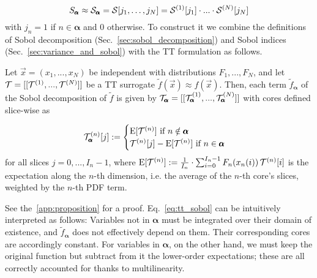 \documentclass[review, twocolumn]{svjour3}          %
\begin{document}
\begin{equation}
S_{\pmb{\alpha}} \approx \mathcal{S}_{\pmb{\alpha}} = \mathcal{S}[j_1, \dots, j_N] = \mathcal{S}^{(1)}[j_1] \cdot ... \cdot \mathcal{S}^{(N)}[j_N]
\end{equation}
%
with $j_n = 1$ if $n \in \pmb{\alpha}$ and $0$ otherwise. 
To construct it we combine the definitions of Sobol decomposition (Sec.~\ref{sec:sobol_decomposition}) and Sobol indices (Sec.~\ref{sec:variance_and_sobol}) with the TT formulation as follows.

\begin{proposition} \label{prop:tt_sobol}
Let $\vec{x} = (x_1, ..., x_N)$ be independent with distributions $F_1, ..., F_N$, and let $\mathcal{T} = [[\mathcal{T}^{(1)}, ..., \mathcal{T}^{(N)}]]$ be a TT surrogate $\tilde{f}(\vec{x}) \approx f(\vec{x})$. Then, each term $\tilde{f}_{\pmb{\alpha}}$ of the Sobol decomposition of $\tilde{f}$ is given by $\mathcal{T}_{\pmb{\alpha}} = [[\mathcal{T}^{(1)}_{\pmb{\alpha}}, ..., \mathcal{T}^{(N)}_{\pmb{\alpha}}]]$ with cores defined slice-wise as

\begin{equation}
\label{eq:tt_sobol}
\mathcal{T}^{(n)}_{\pmb{\alpha}}[j] :=
\begin{cases}
\operatorname{E}[\mathcal{T}^{(n)}] \mbox{ if } n \notin \pmb{\alpha} \\
\mathcal{T}^{(n)}[j] - \operatorname{E}[\mathcal{T}^{(n)}] \mbox{ if } n \in \pmb{\alpha}
\end{cases}
\end{equation}
%
for all slices $j = 0,..., I_n-1$, where $\operatorname{E}[\mathcal{T}^{(n)}] := \frac{1}{I_n} \cdot \sum_{i=0}^{I_n-1} F_n(x_n(i)) \, \mathcal{T}^{(n)}[i]$ is the expectation along the $n$-th dimension, i.e. the average of the $n$-th core's slices, weighted by the $n$-th PDF term.
\end{proposition}

See the~\ref{app:proposition} for a proof. Eq.~\ref{eq:tt_sobol} can be intuitively interpreted as follows: Variables not in $\pmb{\alpha}$ must be integrated over their domain of existence, and $\tilde{f}_{\pmb{\alpha}}$ does not effectively depend on them. Their corresponding cores are accordingly constant. For variables in $\pmb{\alpha}$, on the other hand, we must keep the original function but subtract from it the lower-order expectations; these are all correctly accounted for thanks to multilinearity.
\end{document}
